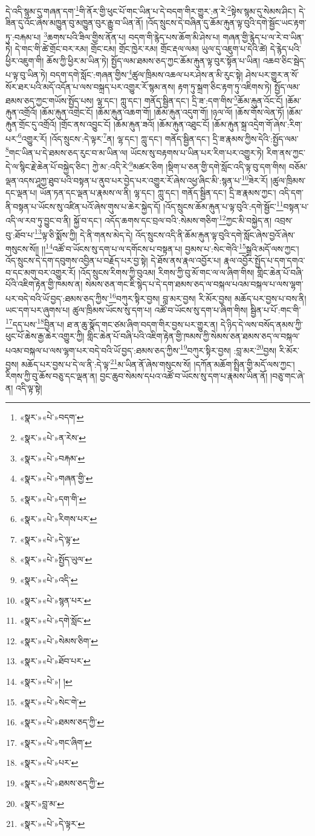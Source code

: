 དེ་འདི་སྙམ་དུ་གཞན་དག་\footnote{«སྣར་»«པེ་»བདག་}གི་ནོར་གྱི་ཕུང་པོ་གང་ཡིན་པ་དེ་བདག་གིར་གྱུར་:ན་རེ་\footnote{«སྣར་»«པེ་»ན་རེས་}སྟེས་སྙམ་དུ་སེམས་ཤིང་། དེ་ཟིན་དུ་འོང་ཞེས་མཁྱུན་བུ་མཁྱུན་བུར་རྒྱུ་བ་ཡིན་ནོ། །འོད་སྲུངས་དེ་བཞིན་དུ་ཆོམ་རྐུན་ལྟ་བུའི་དགེ་སྦྱོང་ཡང་རྟག་ཏུ་:བརྐམ་པ། \footnote{«སྣར་»«པེ་»བརྐམ་}ཆགས་པའི་ཟིལ་གྱིས་ནོན་པ། བདག་གི་རྙེད་པས་ཆོག་མི་ཤེས་པ། གཞན་གྱི་རྙེད་པ་ལ་རེ་བ་ཡིན་ཏེ། དེ་གང་གི་ཚེ་གྲོང་བར་རམ། གྲོང་ངམ། གྲོང་ཁྱེར་རམ། གྲོང་རྡལ་ལམ། ཡུལ་དུ་འཇུག་པ་དེའི་ཚེ། དེ་རྙེད་པའི་ཕྱིར་འཇུག་གི། ཆོས་ཀྱི་ཕྱིར་མ་ཡིན་ཏེ། སྤྱོད་ལམ་ཐམས་ཅད་ཀྱང་ཆོམ་རྐུན་ལྟ་བུར་སྟོན་པ་ཡིན། འཆབ་ཅིང་སྦེད་པ་ལྟ་བུ་ཡིན་ཏེ། བདག་དགེ་སློང་:གཞན་གྱིས་\footnote{«སྣར་»«པེ་»གཞན་གྱི་}ཚུལ་ཁྲིམས་འཆལ་པར་ཤེས་ན་མི་རུང་སྟེ། ཤེས་པར་གྱུར་ན་སོ་སོར་ཐར་པའི་མདོ་འདོན་པ་ལས་བསྐྲད་པར་འགྱུར་རོ་སྙམ་ནས། རྟག་ཏུ་སྐྲག་ཅིང་རྟག་ཏུ་འཇིགས་ཏེ། སྤྱོད་ལམ་ཐམས་ཅད་ཀྱང་གཡོས་སྤྱོད་པས། ལྷ་དང་། ཀླུ་དང་། གནོད་སྦྱིན་དང་། དྲི་ཟ་:དག་གིས་\footnote{«སྣར་»«པེ་»དག་གི་}ཆོམ་རྐུན་འོང་ངོ། །ཆོམ་རྐུན་འགྲོའོ། །ཆོམ་རྐུན་འགྲེང་ངོ། །ཆོམ་རྐུན་འཆག་གོ། །ཆོམ་རྐུན་འདུག་གོ། །ཉལ་ལོ། །ཆོས་གོས་ལེན་ཏོ། །ཆོམ་རྐུན་གྲོང་དུ་འགྲོའོ། །གྲོང་ནས་འབྱུང་ངོ། །ཆོམ་རྐུན་ཟའོ། །ཆོམ་རྐུན་འཐུང་ངོ། །ཆོམ་རྐུན་སྐྲ་འདྲེག་གོ་ཞེས་:རིག་པར་\footnote{«སྣར་»«པེ་»རིགས་པར་}འགྱུར་རོ། །འོད་སྲུངས་:དེ་ལྟར་\footnote{«སྣར་»«པེ་»དེ་ལྟ་}ན། ལྷ་དང་། ཀླུ་དང་། གནོད་སྦྱིན་དང་། དྲི་ཟ་རྣམས་ཀྱིས་དེའི་:སྤྱོད་ལམ་\footnote{«སྣར་»«པེ་»སྤྱོད་ཡུལ་}གང་ཡིན་པ་དེ་ཐམས་ཅད་རུང་བ་མ་ཡིན་ལ། ཡོངས་སུ་བརྟགས་པ་ཡིན་པར་རིག་པར་འགྱུར་ཏེ། རིག་ནས་ཀྱང་དེ་ལ་སྙིང་རྗེ་ཆེན་པོ་བསྐྱེད་ཅིང་། ཀྱེ་མ་:འདི་རེ་\footnote{«སྣར་»«པེ་»འདི་}མཚར་ཅིག །སྡིག་པ་ཅན་གྱི་དགེ་སློང་འདི་ལྟ་བུ་དག་གིས། བཅོམ་ལྡན་འདས་ཤཱཀྱ་ཐུབ་པའི་བསྟན་པ་ནུབ་པར་བྱེད་པར་འགྱུར་རོ་ཞེས་འཕྱ་ཞིང་མི་:སྙན་པ་\footnote{«སྣར་»«པེ་»སྙན་པར་}ཟེར་རོ། །ཚུལ་ཁྲིམས་དང་ལྡན་པ། ཡོན་ཏན་དང་ལྡན་པ་རྣམས་ལ་ནི། ལྷ་དང་། ཀླུ་དང་། གནོད་སྦྱིན་དང་། དྲི་ཟ་རྣམས་ཀྱང་། འདི་དག་ནི་བསྟན་པ་ཡོངས་སུ་འཛིན་པའོ་ཞེས་གུས་པ་ཆེར་སྐྱེད་དོ། །འོད་སྲུངས་ཆོམ་རྐུན་པ་ལྟ་བུའི་:དགེ་སྦྱོང་\footnote{«སྣར་»«པེ་»དགེ་སློང་}བསྟན་པ་འདི་ལ་རབ་ཏུ་བྱུང་བ་ནི། སྐྱོ་བ་དང་། འདོད་ཆགས་དང་བྲལ་བའི་:སེམས་གཅིག་\footnote{«སྣར་»«པེ་»སེམས་ཅིག་}ཀྱང་མི་བསྐྱེད་ན། འབྲས་བུ་:ཐོབ་པ་\footnote{«སྣར་»«པེ་»ཐོབ་པར་}ལྟ་ཅི་སྨོས་ཀྱི། དེ་ནི་གནས་མེད་དེ། འོད་སྲུངས་འདི་ནི་ཆོམ་རྐུན་ལྟ་བུའི་དགེ་སློང་ཞེས་བྱའོ་ཞེས་གསུངས་སོ།། །།\footnote{«སྣར་»«པེ་»། །}འཚོ་བ་ཡོངས་སུ་དག་པ་ལ་དགོངས་པ་བསྟན་པ། བྱམས་པ་:སེང་གེའི་\footnote{«སྣར་»«པེ་»སེང་གེ་}སྒྲའི་མདོ་ལས་ཀྱང་། འོད་སྲུངས་དེ་དག་དབུགས་འབྱིན་པ་བརྗོད་པར་བྱ་སྟེ། དེ་ཐོས་ནས་རྣལ་འབྱོར་པ། རྣལ་འབྱོར་སྤྱོད་པ་དག་དགའ་བ་དང་མགུ་བར་འགྱུར་རོ། །འོད་སྲུངས་རིགས་ཀྱི་བུའམ། རིགས་ཀྱི་བུ་མོ་གང་ལ་ལ་ཞིག་གིས། གླིང་ཆེན་པོ་བཞི་པོའི་འཇིག་རྟེན་གྱི་ཁམས་ན། སེམས་ཅན་གང་ཇི་སྙེད་པ་དེ་དག་ཐམས་ཅད་ལ་བསྐལ་པའམ་བསྐལ་པ་ལས་ལྷག་པར་བདེ་བའི་ཡོ་བྱད་:ཐམས་ཅད་ཀྱིས་\footnote{«སྣར་»«པེ་»ཐམས་ཅད་ཀྱི་}བཀུར་སྟིར་བྱས། བླ་མར་བྱས། རི་མོར་བྱས། མཆོད་པར་བྱས་པ་བས་ནི། ཡང་དག་པར་ཞུགས་པ། ཚུལ་ཁྲིམས་ཡོངས་སུ་དག་པ། འཚོ་བ་ཡོངས་སུ་དག་པ་ཞིག་གིས། སྦྱིན་པ་པོ་:གང་གི་\footnote{«སྣར་»«པེ་»གང་ཞིག་}དད་པས་\footnote{«སྣར་»«པེ་»པར་}བྱིན་པ། ཐ་ན་ཆུ་སྣོད་གང་ཙམ་ཞིག་བདག་གིར་བྱས་པར་གྱུར་ན། དེ་ཉིད་དེ་ལས་བསོད་ནམས་ཀྱི་ཕུང་པོ་ཆེས་རྒྱ་ཆེར་འགྱུར་ཀྱི། གླིང་ཆེན་པོ་བཞི་པའི་འཇིག་རྟེན་གྱི་ཁམས་ཀྱི་སེམས་ཅན་ཐམས་ཅད་ལ་བསྐལ་པའམ་བསྐལ་པ་ལས་ལྷག་པར་བདེ་བའི་ཡོ་བྱད་:ཐམས་ཅད་ཀྱིས་\footnote{«སྣར་»«པེ་»ཐམས་ཅད་ཀྱི་}བཀུར་སྟིར་བྱས། :བླ་མར་\footnote{«སྣར་»བླ་མ་}བྱས། རི་མོར་བྱས། མཆོད་པར་བྱས་པ་དེ་ལ་ནི་:དེ་ལྟ་\footnote{«སྣར་»«པེ་»དེ་ལྟར་}མ་ཡིན་ནོ་ཞེས་གསུངས་སོ། །དཀོན་མཆོག་སྤྲིན་གྱི་མདོ་ལས་ཀྱང་། རིགས་ཀྱི་བུ་ཆོས་བཅུ་དང་ལྡན་ན། བྱང་ཆུབ་སེམས་དཔའ་འཚོ་བ་ཡོངས་སུ་དག་པ་རྣམས་ཡིན་ནོ། །བཅུ་གང་ཞེ་ན། འདི་ལྟ་སྟེ། 